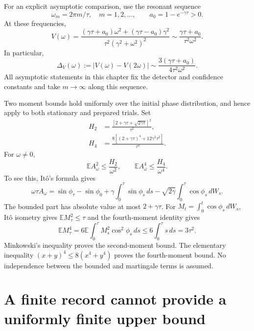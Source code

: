 For an explicit asymptotic comparison, use the resonant sequence
\begin{equation}
 \omega_m=2\pi m/\tau,\quad m=1,2,\ldots,
 \qquad a_0=1-e^{-\gamma\tau}>0.
 \label{eq:dg-resonant-family}
\end{equation}
At these frequencies,
\begin{equation}
 V(\omega)=
 \frac{(\gamma\tau+a_0)\omega^2
       +(\gamma\tau-a_0)\gamma^2}
      {\tau^2(\gamma^2+\omega^2)^2}
 \sim\frac{\gamma\tau+a_0}{\tau^2\omega^2}.
 \label{eq:dg-resonant-variance}
\end{equation}
In particular,
\begin{equation}
 \Delta_V(\omega):=|V(\omega)-V(2\omega)|
 \sim\frac{3(\gamma\tau+a_0)}{4\tau^2\omega^2}.
 \label{eq:dg-variance-gap}
\end{equation}
All asymptotic statements in this chapter fix the detector and confidence
constants and take $m\to\infty$ along this sequence.

Two moment bounds hold uniformly over the initial phase distribution,
and hence apply to both stationary and prepared trials. Set
\begin{align}
 H_2&=\frac{[2+\gamma\tau+\sqrt{2\gamma\tau}]^2}{\tau^2},\\
 H_4&=\frac{8[(2+\gamma\tau)^4+12\gamma^2\tau^2]}{\tau^4}.
 \label{eq:dg-ito-constants}
\end{align}
For $\omega\ne0$,
\begin{equation}
 \mathbb E A_\omega^2\leq\frac{H_2}{\omega^2},
 \qquad
 \mathbb E A_\omega^4\leq\frac{H_4}{\omega^4}.
 \label{eq:dg-ito-moments}
\end{equation}
To see this, It\^o's formula gives
\begin{equation}
 \omega\tau A_\omega
 =\sin\phi_\tau-\sin\phi_0
   +\gamma\int_0^\tau\sin\phi_s\,ds
   -\sqrt{2\gamma}\int_0^\tau\cos\phi_s\,dW_s.
 \label{eq:dg-ito-exposure}
\end{equation}
The bounded part has absolute value at most $2+\gamma\tau$. For
$M_t=\int_0^t\cos\phi_s\,dW_s$, It\^o isometry gives
$\mathbb E M_\tau^2\leq\tau$ and the fourth-moment identity gives
\[
 \mathbb E M_\tau^4
 =6\mathbb E\int_0^\tau M_s^2\cos^2\phi_s\,ds
 \leq6\int_0^\tau s\,ds=3\tau^2.
\]
Minkowski's inequality proves the second-moment bound. The elementary
inequality $(x+y)^4\leq8(x^4+y^4)$ proves the fourth-moment bound.
No independence between the bounded and martingale terms is assumed.

\section{A finite record cannot provide a uniformly finite upper bound}

